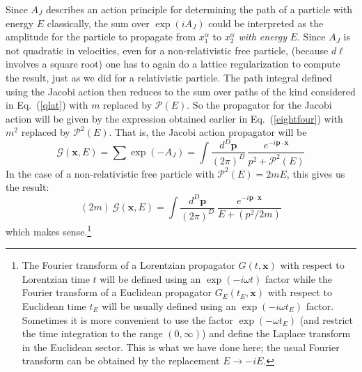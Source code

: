 \documentclass[12pt]{article}
\def\eq#1{{Eq.~(\ref{#1})}}
\begin{document}
Since $A_J$ describes an  action principle for determining the path of a particle with energy $E$ classically, the sum over $\exp(iA_J)$ could be interpreted  as the amplitude for the particle to propagate from $x^\alpha_1$ to  $x^\alpha_2$ \textit{with energy} $E$.  Since $A_J$ is not quadratic 
in velocities,  even for a non-relativistic free particle, (because $d\ell  $ involves a square root) one has to  again do a lattice regularization to compute the result, just as we did for a relativistic particle. The path integral defined using the Jacobi action then reduces to the sum over paths of the kind considered in \eq{qlat} with $m$ replaced by $\mathcal{P}(E)$. So the propagator for the Jacobi action will be given by the expression obtained earlier in \eq{eightfour} with $m^2$ replaced by $\mathcal{P}^2(E)$. That is, the Jacobi action propagator will be 
\begin{equation}
 \mathcal{G}(\bm{x},E) = \sum\exp (-A_J)=\int \frac{d^D\bm{p}}{(2\pi)^D} \, \frac{ e^{-i\bm{p\cdot x}}}{p^2+\mathcal{P}^2(E)}
\end{equation} 
In the case of a non-relativistic free particle with $\mathcal{P}^2(E) = 2mE$,  this gives us the result:
\begin{equation}
 (2m) \ \mathcal{G}(\bm{x},E) = \int \frac{d^D\bm{p}}{(2\pi)^D}\ \frac{e^{-i\bm{p\cdot x}}}{E + (p^2/2m)}
\end{equation} 
which makes sense.\footnote{The Fourier transform of a Lorentzian propagator $G(t, \bm{x})$ with respect to Lorentzian time $t$ will be defined using an $\exp(-i\omega t)$ factor while the Fourier transform of a Euclidean propagator $G_E(t_E, \bm{x})$ with respect to Euclidean time $t_E$ will be usually defined using an $\exp(-i\omega t_E)$ factor. Sometimes it is more convenient to use the factor $\exp(-\omega t_E)$ (and restrict the time integration to the range $(0,\infty)$) and define the Laplace transform in the Euclidean sector. This is what we have done here; the usual Fourier transform can be obtained by the replacement $E\to -iE$.}
\end{document}
